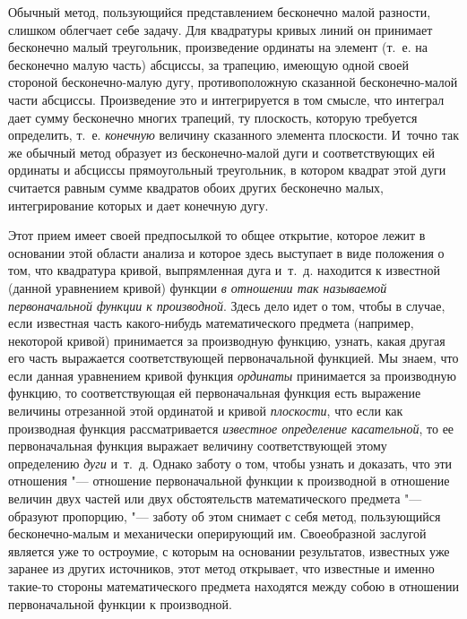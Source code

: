 Обычный метод, пользующийся представлением бесконечно малой разности,
слишком облегчает себе задачу. Для квадратуры кривых линий он принимает
бесконечно малый треугольник, произведение ординаты на элемент (т.~е. на
бесконечно малую часть) абсциссы, за трапецию, имеющую одной своей стороной
бесконечно-малую дугу, противоположную сказанной бесконечно-малой части
абсциссы. Произведение это и интегрируется в том смысле, что интеграл дает
сумму бесконечно многих трапеций, ту плоскость, которую требуется
определить, т.~е. {\em конечную} величину сказанного
элемента плоскости. И~точно так же обычный метод образует из
бесконечно-малой дуги и соответствующих ей ординаты и абсциссы
прямоугольный треугольник, в котором квадрат этой дуги считается равным
сумме квадратов обоих других бесконечно малых, интегрирование которых и
дает конечную дугу.

Этот прием имеет своей предпосылкой то общее открытие, которое лежит в
основании этой области анализа и которое здесь выступает в виде положения о
том, что квадратура кривой, выпрямленная дуга и~т.~д. находится к известной
(данной уравнением кривой) функции {\em в отношении так
называемой первоначальной функции к производной}. Здесь дело идет о том,
чтобы в случае, если известная часть какого-нибудь математического предмета
(например, некоторой кривой) принимается за производную функцию, узнать,
какая другая его часть выражается соответствующей первоначальной функцией.
Мы знаем, что если данная уравнением кривой функция
{\em ординаты} принимается за производную функцию, то
соответствующая ей первоначальная функция есть выражение величины
отрезанной этой ординатой и кривой {\em плоскости}, что
если как производная функция рассматривается
{\em известное определение касательной}, то ее
первоначальная функция выражает величину соответствующей этому определению
{\em дуги} и~т.~д. Однако заботу о том, чтобы узнать и
доказать, что эти отношения "--- отношение первоначальной функции к
производной в отношение величин двух частей или двух обстоятельств
математического предмета "--- образуют пропорцию, "--- заботу об этом снимает с
себя метод, пользующийся бесконечно-малым и механически оперирующий им.
Своеобразной заслугой является уже то остроумие, с которым на основании
результатов, известных уже заранее из других источников, этот метод
открывает, что известные и именно такие-то стороны математического предмета
находятся между собою в отношении первоначальной функции к производной.

